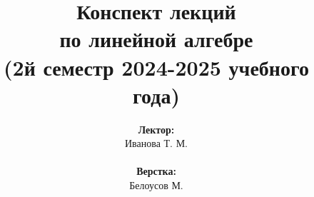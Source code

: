 \documentclass[../main.tex]{subfiles}
\begin{document}
\title{
    \bfseries
    {\Huge Конспект лекций\\ по линейной алгебре}\\
    {\large (2й семестр 2024-2025 учебного года)}
}
\author{
    \textbf{Лектор:}\\ Иванова Т. М.
    \\ ~ \\ 
    \textbf{Верстка:}\\ Белоусов М.
}

\date{}
\maketitle
\setcounter{page}{2}
\end{document}
